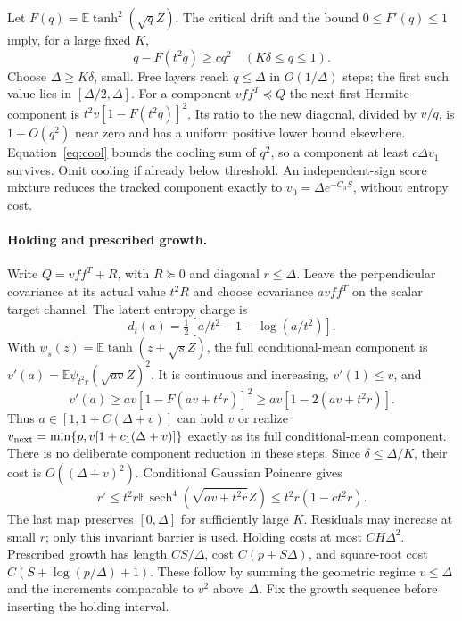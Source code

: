 \documentclass[11pt]{article}
\newcommand{\E}{\mathbb E}
\begin{document}
Let $F(q)=\E\tanh^2(\sqrt qZ)$. The critical drift and the bound
$0\le F'(q)\le1$ imply, for a large fixed $K$,
\begin{equation}\label{eq:cool}
 q-F(t^2q)\ge cq^2\quad(K\delta\le q\le1).
\end{equation}
Choose $\Delta\ge K\delta$, small. Free layers reach $q\le\Delta$
in $O(1/\Delta)$ steps; the first such value lies in
$[\Delta/2,\Delta]$. For a component $vff^T\preceq Q$ the next
first-Hermite component is $t^2v[1-F(t^2q)]^2$. Its ratio to the new
diagonal, divided by $v/q$, is $1+O(q^2)$ near zero and has a uniform
positive lower bound elsewhere. Equation~\eqref{eq:cool} bounds the
cooling sum of $q^2$, so a component at least $c\Delta v_1$ survives.
Omit cooling if already below threshold. An independent-sign score
mixture reduces the tracked component exactly to
$v_0=\Delta e^{-C_3S}$, without entropy cost.

\paragraph{Holding and prescribed growth.}
Write $Q=vff^T+R$, with $R\succeq0$ and diagonal $r\le\Delta$.
Leave the perpendicular covariance at its actual value $t^2R$ and
choose covariance $avff^T$ on the scalar target channel. The latent
entropy charge is
\begin{equation}\label{eq:latent}
 d_t(a)=\tfrac12[a/t^2-1-\log(a/t^2)].
\end{equation}
With $\psi_s(z)=\E\tanh(z+\sqrt sZ)$, the full conditional-mean
component is $v'(a)=\E\psi_{t^2r}(\sqrt{av}Z)^2$. It is continuous
and increasing, $v'(1)\le v$, and
\[
 v'(a)\ge av[1-F(av+t^2r)]^2\ge av[1-2(av+t^2r)].
\]
Thus $a\in[1,1+C(\Delta+v)]$ can hold $v$ or realize
$v_{\rm next}=\min\{p,v[1+c_1(\Delta+v)]\}$ exactly as its full
conditional-mean component. There is no deliberate component reduction
in these steps. Since $\delta\le\Delta/K$, their cost is
$O((\Delta+v)^2)$.
Conditional Gaussian Poincare gives
\[
 r'\le t^2r\E\operatorname{sech}^4(\sqrt{av+t^2r}Z)
     \le t^2r(1-ct^2r).
\]
The last map preserves $[0,\Delta]$ for sufficiently large $K$.
Residuals may increase at small $r$; only this invariant barrier is used.
Holding costs at most $CH\Delta^2$. Prescribed growth has length
$CS/\Delta$, cost $C(p+S\Delta)$, and square-root cost
$C(S+\log(p/\Delta)+1)$. These follow by summing the geometric regime
$v\le\Delta$ and the increments comparable to $v^2$ above $\Delta$.
Fix the growth sequence before inserting the holding interval.
\end{document}
